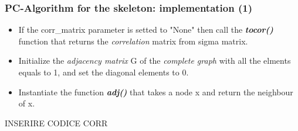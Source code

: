 \documentclass[xcolor ={table,usenames,dvipsnames}]{beamer}
\theoremstyle{definition}
\begin{document}

	
	
	\begin{frame}
		\frametitle{PC-Algorithm for the skeleton: implementation (1)}
		\begin{itemize}
			\item If the corr\_matrix parameter is setted to "None" then call the \textit{\textbf{tocor()}} function that returns the \textit{correlation} matrix from sigma matrix.
			\item Initialize the \textit{adjacency matrix} G of the \textit{complete graph} with all the elments equals to 1, and set the diagonal elements to 0.
			\item Instantiate the function \textit{\textbf{adj()}} that takes a node x and return the neighbour of x.
		\end{itemize}
		INSERIRE CODICE CORR
	\end{frame}
\end{document}
